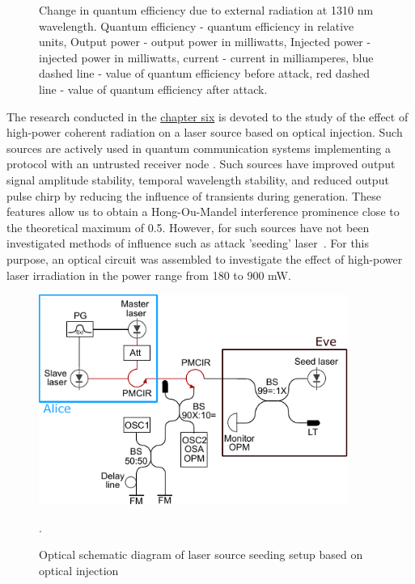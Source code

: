{\begin{figure}
    \caption{Change in quantum efficiency due to external radiation at 1310 nm wavelength. Quantum efficiency - quantum efficiency in relative units, Output power - output power in milliwatts, Injected power - injected power in milliwatts, current - current in milliamperes, blue dashed line - value of quantum efficiency before attack, red dashed line - value of quantum efficiency after attack. }
    \label{fig:eff syn}
\end{figure}
\newpage The research conducted in the \underline{chapter six} is devoted to the study of the effect of high-power coherent radiation on a laser source based on optical injection. Such sources are actively used in quantum communication systems implementing a protocol with an untrusted receiver node \cite{comandar2016,yuan2016,roberts2018}. Such sources have improved output signal amplitude stability, temporal wavelength stability, and reduced output pulse chirp by reducing the influence of transients during generation. These features allow us to obtain a Hong-Ou-Mandel interference prominence close to the theoretical maximum of 0.5. 
\newline However, for such sources have not been investigated methods of influence such as attack 'seeding' laser~\cite{fadeev2024a}. For this purpose, an optical circuit was assembled to investigate the effect of high-power laser irradiation in the power range from 180 to 900 mW. 
\begin{figure}
    \centering
    \includegraphics[width=0.9\textwidth]{images/setup_Faraday_Mirrors_final.pdf}
    \caption{Optical schematic diagram of laser source seeding setup based on optical injection}.
    \label{fig:enter-label}
\end{figure}

}
